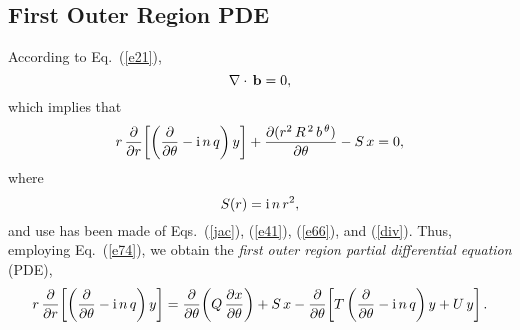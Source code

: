\documentclass[12pt,prb,aps]{revtex4-1}
\begin{document}
\subsection{First Outer Region PDE}
According to Eq.~(\ref{e21}), 
\begin{equation}\label{divb}
\nabla \cdot\,{\bf b} =0,
\end{equation}
which implies that
\begin{equation}
r\,\frac{\partial}{\partial r}\!\left[\left(\frac{\partial}{\partial\theta}-{\rm i}\,n\,q\right)y\right]+\frac{\partial (r^2\,R^{\,2}\,b^{\,\theta})}{\partial \theta} - S\,x=0,
\end{equation}
where
\begin{equation}\label{s}
S(r) = {\rm i}\,n\,r^2,
\end{equation}
and use has been made of Eqs.~(\ref{jac}),  (\ref{e41}),  (\ref{e66}), and (\ref{div}).
Thus, employing Eq.~(\ref{e74}), we obtain the {\em first outer region partial differential equation}\/ (PDE), \cite{connor}
\begin{equation}\label{efirst}
r\,\frac{\partial}{\partial r}\!\left[\left(\frac{\partial}{\partial\theta}-{\rm i}\,n\,q\right)y\right]=\frac{\partial}{\partial\theta}\!\left(Q\,\frac{\partial x}{\partial\theta}\right)
+S\,x -\frac{\partial}{\partial\theta}\!\left[T\left(\frac{\partial}{\partial\theta}-{\rm i}\,n\,q\right)y+U\,y\right].
\end{equation}
\end{document}

